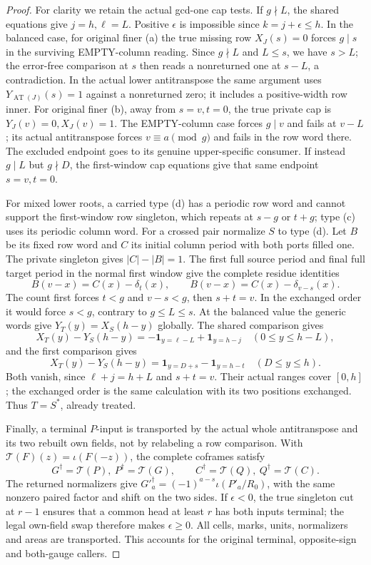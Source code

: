 \documentclass[11pt,a4paper]{amsart}
\numberwithin{equation}{section}
\theoremstyle{plain}
\theoremstyle{definition}
\newcommand{\one}{\mathbf1}
\newcommand{\AT}{\operatorname{AT}}
\begin{document}
\begin{proof}
For clarity we retain the actual gcd-one cap tests.  If \(g\nmid L\),
the shared equations give \(j=h,\ell=L\).  Positive \(\epsilon\)
is impossible since \(k=j+\epsilon\le h\).  In the balanced case,
for original finer (a) the true missing row \(X_J(s)=0\) forces
\(g\mid s\) in the surviving EMPTY-column reading.  Since
\(g\nmid L\) and \(L\le s\), we have \(s>L\); the error-free
comparison at \(s\) then reads a nonreturned one at \(s-L\), a
contradiction.  In the actual lower antitranspose the same argument uses
\(Y_{\AT(J)}(s)=1\) against a nonreturned zero; it includes a
positive-width row inner.  For original finer (b), away from
\(s=v,t=0\), the true private cap is
\(Y_J(v)=0,X_J(v)=1\).  The EMPTY-column case forces \(g\mid v\)
and fails at \(v-L\); its actual antitranspose forces
\(v\equiv a\pmod g\) and fails in the row word there.  The excluded
endpoint goes to its genuine upper-specific consumer.  If instead
\(g\mid L\) but \(g\nmid D\), the first-window cap equations give
that same endpoint \(s=v,t=0\).

For mixed lower roots, a carried type (d) has a periodic row word and
cannot support the first-window row singleton, which repeats at
\(s-g\) or \(t+g\); type (c) uses its periodic column word.
For a crossed pair normalize \(S\) to type (d).  Let \(B\) be its
fixed row word and \(C\) its initial column period with both ports
filled one.  The private singleton gives \(|C|-|B|=1\).
The first full source period and final full target period in the normal
first window give the complete residue identities
\[
 B(v-x)=C(x)-\delta_t(x),\qquad
 B(v-x)=C(x)-\delta_{v-s}(x).
\]
The count first forces \(t<g\) and \(v-s<g\), then
\(s+t=v\).  In the exchanged order it would force \(s<g\), contrary
to \(g\le L\le s\).  At the balanced value the generic words give
\(Y_T(y)=X_S(h-y)\) globally.  The shared comparison gives
\[
 X_T(y)-Y_S(h-y)=-\one_{y=\ell-L}+\one_{y=h-j}
 \quad(0\le y\le h-L),
\]
and the first comparison gives
\[
 X_T(y)-Y_S(h-y)=\one_{y=D+s}-\one_{y=h-t}
 \quad(D\le y\le h).
\]
Both vanish, since \(\ell+j=h+L\) and \(s+t=v\).  Their actual
ranges cover \([0,h]\); the exchanged order is the same calculation
with its two positions exchanged.  Thus \(T=S^*\), already treated.

Finally, a terminal \(P\)-input is transported by the actual whole
antitranspose and its two rebuilt own fields, not by relabeling a row
comparison.  With \(\mathcal T(F)(z)=\iota(F(-z))\), the complete
coframes satisfy
\[
 G^\dagger=\mathcal T(P),\ P^\dagger=\mathcal T(G),\qquad
 C^\dagger=\mathcal T(Q),\ Q^\dagger=\mathcal T(C).
\]
The returned normalizers give
\(G'^\dagger_a=(-1)^{a-s}\iota(P'_a/R_0)\), with the same
nonzero paired factor and shift on the two sides.  If
\(\epsilon<0\), the true singleton cut at \(r-1\) ensures that a
common head at least \(r\) has both inputs terminal; the legal own-field
swap therefore makes \(\epsilon\ge0\).  All cells, marks, units,
normalizers and areas are transported.  This accounts for the original
terminal, opposite-sign and both-gauge callers.
\end{proof}
\end{document}
